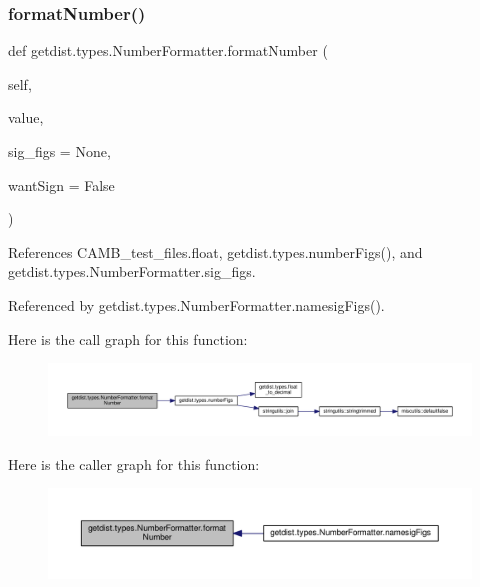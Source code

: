 \subsubsection{\texorpdfstring{format\+Number()}{formatNumber()}}
{\footnotesize\ttfamily def getdist.\+types.\+Number\+Formatter.\+format\+Number (\begin{DoxyParamCaption}\item[{}]{self,  }\item[{}]{value,  }\item[{}]{sig\+\_\+figs = {\ttfamily None},  }\item[{}]{want\+Sign = {\ttfamily False} }\end{DoxyParamCaption})}



References C\+A\+M\+B\+\_\+test\+\_\+files.\+float, getdist.\+types.\+number\+Figs(), and getdist.\+types.\+Number\+Formatter.\+sig\+\_\+figs.



Referenced by getdist.\+types.\+Number\+Formatter.\+namesig\+Figs().

Here is the call graph for this function\+:
\nopagebreak
\begin{figure}[H]
\begin{center}
\leavevmode
\includegraphics[width=350pt]{classgetdist_1_1types_1_1NumberFormatter_a17323aa6fd485dcfe1c120fe7db58243_cgraph}
\end{center}
\end{figure}
Here is the caller graph for this function\+:
\nopagebreak
\begin{figure}[H]
\begin{center}
\leavevmode
\includegraphics[width=350pt]{classgetdist_1_1types_1_1NumberFormatter_a17323aa6fd485dcfe1c120fe7db58243_icgraph}
\end{center}
\end{figure}
\mbox{\label{classgetdist_1_1types_1_1NumberFormatter_a8155a1cfc8dfb1430639147398d6e444}} 
